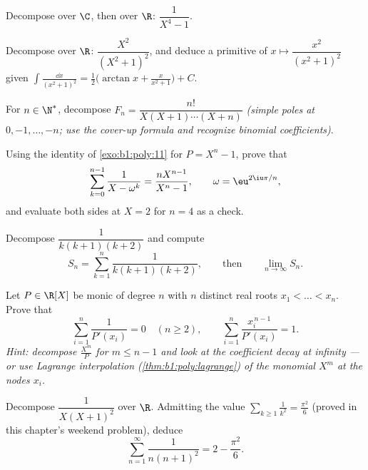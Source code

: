 \begin{exercise}[$\star\star$]\label{exo:b1:fractions:4}
Decompose over $\C$, then over $\R$: $\dfrac{1}{X^4 - 1}$.
\end{exercise}

\begin{exercise}[$\star\star$]\label{exo:b1:fractions:5}
Decompose over $\R$: $\dfrac{X^2}{(X^2 + 1)^2}$, and deduce a
primitive of $x \mapsto \dfrac{x^2}{(x^2+1)^2}$ given
$\int \frac{\dd x}{(x^2+1)^2} = \frac12\bigl(\arctan x +
\frac{x}{x^2+1}\bigr) + C$.
\end{exercise}

\begin{exercise}[$\star\star$]\label{exo:b1:fractions:6}
For $n \in \N^*$, decompose $F_n = \dfrac{n!}{X(X+1)\cdots(X+n)}$
\emph{(simple poles at $0, -1, \dots, -n$; use the cover-up formula
and recognize binomial coefficients)}.
\end{exercise}

\begin{exercise}[$\star\star$]\label{exo:b1:fractions:7}
Using the identity of \cref{exo:b1:poly:11} for $P = X^n - 1$,
prove that
\[
\sum_{k=0}^{n-1} \frac{1}{X - \omega^k} = \frac{n X^{n-1}}{X^n - 1},
\qquad \omega = \eu^{2\iu\pi/n},
\]
and evaluate both sides at $X = 2$ for $n = 4$ as a check.
\end{exercise}

\begin{exercise}[$\star\star$]\label{exo:b1:fractions:8}
Decompose $\dfrac{1}{k(k+1)(k+2)}$ and compute
\[
S_n = \sum_{k=1}^{n} \frac{1}{k(k+1)(k+2)},
\qquad\text{then}\qquad
\lim_{n \to \infty} S_n .
\]
\end{exercise}

\begin{exercise}[$\star\star\star$]\label{exo:b1:fractions:9}
Let $P \in \R[X]$ be monic of degree $n$ with $n$ distinct real roots
$x_1 < \dots < x_n$. Prove that
\[
\sum_{i=1}^{n} \frac{1}{P'(x_i)} = 0 \quad (n \geq 2),
\qquad
\sum_{i=1}^{n} \frac{x_i^{\,n-1}}{P'(x_i)} = 1 .
\]
\emph{Hint: decompose $\frac{X^m}{P}$ for $m \leq n - 1$ and look at
the coefficient decay at infinity --- or use Lagrange interpolation
(\cref{thm:b1:poly:lagrange}) of the monomial $X^m$ at the nodes
$x_i$.}
\end{exercise}

\begin{exercise}[$\star\star$]\label{exo:b1:fractions:10}
Decompose $\dfrac{1}{X(X+1)^2}$ over $\R$. Admitting the value
$\sum_{k \geq 1} \frac1{k^2} = \frac{\pi^2}6$ (proved in this
chapter's weekend problem), deduce
\[
\sum_{n=1}^{\infty} \frac{1}{n(n+1)^2} = 2 - \frac{\pi^2}{6} .
\]
\end{exercise}

